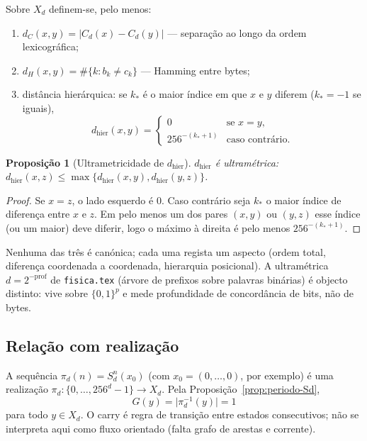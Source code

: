 \documentclass[11pt,a4paper]{article}
\newtheorem{proposicao}{Proposição}
\begin{document}
Sobre \(X_d\) definem-se, pelo menos:
\begin{enumerate}[leftmargin=1.5em]
\item \(d_C(x,y)=\lvert C_d(x)-C_d(y)\rvert\) --- separação ao longo da ordem lexicográfica;
\item \(d_H(x,y)=\#\{k:b_k\neq c_k\}\) --- Hamming entre bytes;
\item distância hierárquica: se \(k_*\) é o maior índice em que \(x\) e \(y\) diferem (\(k_*=-1\) se iguais),
\[
d_{\mathrm{hier}}(x,y)
=
\begin{cases}
0 & \text{se }x=y,\\
256^{-(k_*+1)} & \text{caso contrário.}
\end{cases}
\]
\end{enumerate}

\begin{proposicao}[Ultrametricidade de \(d_{\mathrm{hier}}\)]
\label{prop:hier-ultra}
\(d_{\mathrm{hier}}\) é ultramétrica: \(d_{\mathrm{hier}}(x,z)\le\max\{d_{\mathrm{hier}}(x,y),d_{\mathrm{hier}}(y,z)\}\).
\end{proposicao}

\begin{proof}
Se \(x=z\), o lado esquerdo é \(0\). Caso contrário seja \(k_*\) o maior índice de diferença entre \(x\) e \(z\). Em pelo menos um dos pares \((x,y)\) ou \((y,z)\) esse índice (ou um maior) deve diferir, logo o máximo à direita é pelo menos \(256^{-(k_*+1)}\).
\end{proof}

Nenhuma das três é canónica; cada uma regista um aspecto (ordem total, diferença coordenada a coordenada, hierarquia posicional). A ultramétrica \(d=2^{-\mathrm{prof}}\) de \texttt{fisica.tex} (árvore de prefixos sobre palavras binárias) é objecto distinto: vive sobre \(\{0,1\}^p\) e mede profundidade de concordância de bits, não de bytes.

\subsection{Relação com realização}

A sequência \(\pi_d(n)=S_d^n(x_0)\) (com \(x_0=(0,\dots,0)\), por exemplo) é uma realização \(\pi_d\colon\{0,\dots,256^d-1\}\to X_d\). Pela Proposição~\ref{prop:periodo-Sd},
\[
G(y)=\lvert\pi_d^{-1}(y)\rvert=1
\]
para todo \(y\in X_d\). O carry é regra de transição entre estados consecutivos; não se interpreta aqui como fluxo orientado (falta grafo de arestas e corrente).
\end{document}
